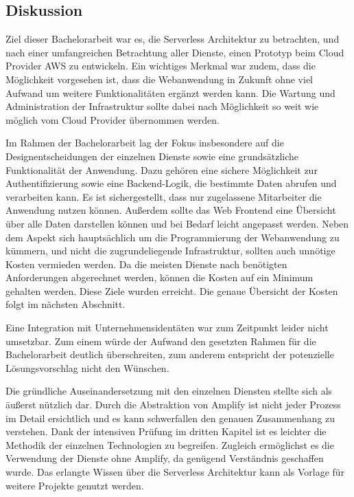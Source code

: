 \subsection{Diskussion}

Ziel dieser Bachelorarbeit war es, die Serverless Architektur zu betrachten, und nach einer umfangreichen Betrachtung aller Dienste, einen Prototyp beim Cloud Provider AWS zu entwickeln.
Ein wichtiges Merkmal war zudem, dass die Möglichkeit vorgesehen ist, dass die Webanwendung in Zukunft ohne viel Aufwand um weitere Funktionalitäten ergänzt werden kann.
Die Wartung und Administration der Infrastruktur sollte dabei nach Möglichkeit so weit wie möglich vom Cloud Provider übernommen werden.

Im Rahmen der Bachelorarbeit lag der Fokus insbesondere auf die Designentscheidungen der einzelnen Dienste sowie eine grundsätzliche Funktionalität der Anwendung.
Dazu gehören eine sichere Möglichkeit zur Authentifizierung sowie eine Backend-Logik, die bestimmte Daten abrufen und verarbeiten kann.
Es ist sichergestellt, dass nur zugelassene Mitarbeiter die Anwendung nutzen können.
Außerdem sollte das Web Frontend eine Übersicht über alle Daten darstellen können und bei Bedarf leicht angepasst werden.
Neben dem Aspekt sich hauptsächlich um die Programmierung der Webanwendung zu kümmern, und nicht die zugrundeliegende Infrastruktur, sollten auch unnötige Kosten vermieden werden.
Da die meisten Dienste nach benötigten Anforderungen abgerechnet werden, können die Kosten auf ein Minimum gehalten werden.
Diese Ziele wurden erreicht. Die genaue Übersicht der Kosten folgt im nächsten Abschnitt.

Eine Integration mit Unternehmensidentäten war zum Zeitpunkt leider nicht umsetzbar.
Zum einem würde der Aufwand den gesetzten Rahmen für die Bachelorarbeit deutlich überschreiten, zum anderem entspricht der potenzielle Lösungsvorschlag nicht den Wünschen.

Die gründliche Auseinandersetzung mit den einzelnen Diensten stellte sich als äußerst nützlich dar.
Durch die Abstraktion von Amplify ist nicht jeder Prozess im Detail ersichtlich und es kann schwerfallen den genauen Zusammenhang zu verstehen.
Dank der intensiven Prüfung im dritten Kapitel ist es leichter die Methodik der einzelnen Technologien zu begreifen.
Zugleich ermöglichst es die Verwendung der Dienste ohne Amplify, da genügend Verständnis geschaffen wurde.
Das erlangte Wissen über die Serverless Architektur kann als Vorlage für weitere Projekte genutzt werden.


